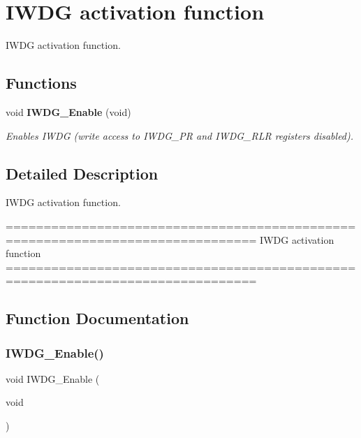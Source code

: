 \section{I\+W\+DG activation function}
\label{group__IWDG__Group2}


I\+W\+DG activation function.  


\subsection*{Functions}
\begin{DoxyCompactItemize}
\item 
void \textbf{ I\+W\+D\+G\+\_\+\+Enable} (void)
\begin{DoxyCompactList}\small\item\em Enables I\+W\+DG (write access to I\+W\+D\+G\+\_\+\+PR and I\+W\+D\+G\+\_\+\+R\+LR registers disabled). \end{DoxyCompactList}\end{DoxyCompactItemize}


\subsection{Detailed Description}
I\+W\+DG activation function. 

\begin{DoxyVerb} ===============================================================================
                          IWDG activation function
 ===============================================================================  \end{DoxyVerb}
 

\subsection{Function Documentation}
\mbox{\label{group__IWDG__Group2_ga479b2921c86f8c67b819f5c4bea6bdb6}} 
\subsubsection{I\+W\+D\+G\+\_\+\+Enable()}
{\footnotesize\ttfamily void I\+W\+D\+G\+\_\+\+Enable (\begin{DoxyParamCaption}\item[{void}]{ }\end{DoxyParamCaption})}



